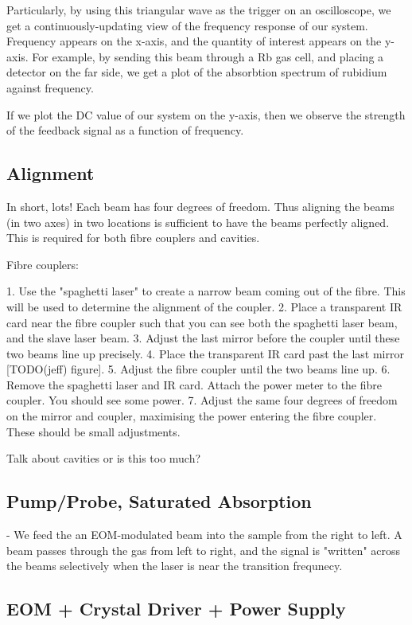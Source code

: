 Particularly, by using this triangular wave as the trigger on an oscilloscope, we get a continuously-updating view of the frequency response of our system.  Frequency appears on the x-axis, and the quantity of interest appears on the y-axis.  For example, by sending this beam through a Rb gas cell, and placing a detector on the far side, we get a plot of the absorbtion spectrum of rubidium against frequency.

If we plot the DC value of our system on the y-axis, then we observe the strength of the feedback signal as a function of frequency.

\subsection{Alignment}

In short, lots!  Each beam has four degrees of freedom.  Thus aligning the beams (in two axes) in two locations is sufficient to have the beams perfectly aligned.  This is required for both fibre couplers and cavities.

Fibre couplers:

 1. Use the "spaghetti laser" to create a narrow beam coming out of the fibre.  This will be used to determine the alignment of the coupler.
 2. Place a transparent IR card near the fibre coupler such that you can see both the spaghetti laser beam, and the slave laser beam.
 3. Adjust the last mirror before the coupler until these two beams line up precisely.
 4. Place the transparent IR card past the last mirror [TODO(jeff) figure].
 5. Adjust the fibre coupler until the two beams line up.
 6. Remove the spaghetti laser and IR card.  Attach the power meter to the fibre coupler.  You should see some power.
 7. Adjust the same four degrees of freedom on the mirror and coupler, maximising the power entering the fibre coupler.  These should be small adjustments.

Talk about cavities or is this too much?
 
\subsection{Pump/Probe, Saturated Absorption}

- We feed the an EOM-modulated beam into the sample from the right to left.  A beam passes through the gas from left to right, and the signal is "written" across the beams selectively when the laser is near the transition frequnecy.

\subsection{EOM + Crystal Driver + Power Supply}

